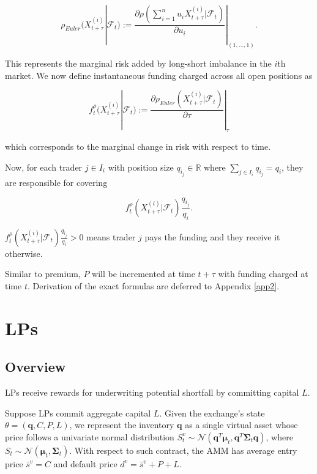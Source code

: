 \documentclass{article}
\begin{document}
\begin{equation}
    \rho_{Euler}(X_{t+\tau}^{(i)}|\mathcal{F}_{t}):= \frac{\partial\rho(\sum_{i=1}^n u_i X_{t+\tau}^{(i)} |\mathcal{F}_t)}{\partial u_i}|_{(1,\dots,1)}.
\end{equation}

This represents the marginal risk added by long-short imbalance in the $i$th market. We now define instantaneous funding charged across all open positions as

\begin{equation}\label{risk-indiff-funding}
f^\rho_t(X^{(i)}_{t+\tau}|\mathcal{F}_t) := \frac{\partial \rho_{Euler}(X_{t+\tau}^{(i)}|\mathcal{F}_t)}{\partial \tau} |_{\tau}
\end{equation}

which corresponds to the marginal change in risk with respect to time. 

Now, for each trader $j \in I_i$ with position size $q_{i_j} \in \mathbb{R}$ where $\sum_{j\in I_i}q_{i_j}=q_{i}$, they are responsible for covering 

\begin{equation}
    f^\rho_t(X^{(i)}_{t+\tau}|\mathcal{F}_t)\frac{q_{i_j}}{q_{i}}.
\end{equation} 

$f^\rho_t(X^{(i)}_{t+\tau}|\mathcal{F}_t)\frac{q_{i_j}}{q_{i}} > 0$ means trader $j$ pays the funding and they receive it otherwise.

Similar to premium, $P$ will be incremented at time $t+\tau$ with funding charged at time $t$. Derivation of the exact formulas are deferred to Appendix \ref{app2}.

\section{LPs}\label{lp}
\subsection{Overview}
LPs receive rewards for underwriting potential shortfall by committing capital $L$. 

Suppose LPs commit aggregate capital $L$. Given the exchange's state $\theta = (\mathbf{q}, C, P, L)$, we represent the inventory $\mathbf{q}$ as a single virtual asset whose price follows a univariate normal distribution $S^v_{t} \sim \mathcal{N}(\mathbf{q}^T \boldsymbol{\mu}_{t}, \mathbf{q}^T \mathbf{\Sigma}_{t} \mathbf{q})$, where $S_t \sim \mathcal{N}(\boldsymbol{\mu}_{t}, \boldsymbol{\Sigma}_{t})$. With respect to such contract, the AMM has average entry price $\bar{s}^v = C$ and default price $d^v = \bar{s}^v + P + L$.
\end{document}

